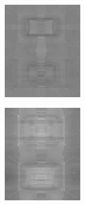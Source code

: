 \documentclass[journal,onecolumn]{IEEEtran}
\begin{document}
{\begin{figure}[H]
\begin{subfigure}[b]{0.2\textwidth}
            \caption{}
            \label{fig:test-crisp-opp-3-rg}
    \end{subfigure}\\
    \begin{subfigure}[b]{0.2\textwidth}
            \centering
            \includegraphics[width=.85\linewidth, frame]{test-crisp-opp-1-by}
            \caption{}
            \label{fig:test-crisp-opp-1-by}
    \end{subfigure}%
    \begin{subfigure}[b]{0.2\textwidth}
            \centering
            \includegraphics[width=.85\linewidth, frame]{test-crisp-opp-2-by}

\end{subfigure}
\end{figure}}
\end{document}
